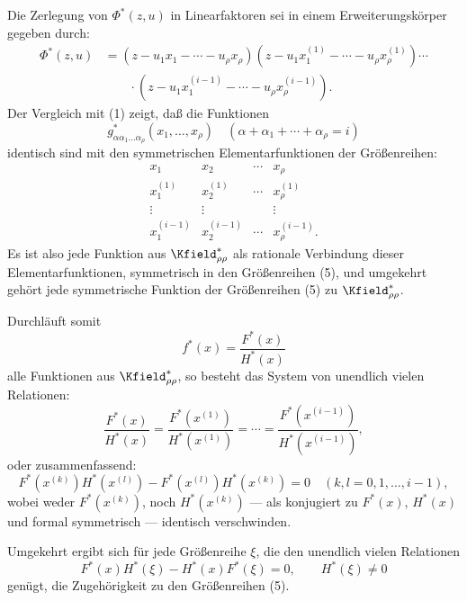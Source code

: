 \documentclass[11pt]{article}
\begin{document}
Die Zerlegung von $\Phi^*(z,u)$ in Linearfaktoren sei in einem Erweiterungskörper gegeben durch:
\begin{equation}
\begin{aligned}
 \Phi^*(z,u)&=(z-u_1x_1-\cdots-u_\rho x_\rho)
 (z-u_1x_1^{(1)}-\cdots-u_\rho x_\rho^{(1)})\cdots\\
 &\qquad\cdot
 (z-u_1x_1^{(i-1)}-\cdots-u_\rho x_\rho^{(i-1)}).
\end{aligned}
\tag{4}
\end{equation}
Der Vergleich mit (1) zeigt, daß die Funktionen
\[
  g^*_{\alpha\alpha_1\ldots\alpha_\rho}(x_1,
  \ldots,x_\rho)\quad(\alpha+\alpha_1+\cdots+\alpha_\rho=i)
\]
identisch sind mit den symmetrischen Elementarfunktionen der Größenreihen:
\begin{equation}
\begin{array}{cccc}
  x_1 & x_2 & \cdots & x_\rho\\
  x_1^{(1)} & x_2^{(1)} & \cdots & x_\rho^{(1)}\\
  \vdots & \vdots & & \vdots\\
  x_1^{(i-1)} & x_2^{(i-1)} & \cdots & x_\rho^{(i-1)}.
\end{array}
\tag{5}
\end{equation}
Es ist also jede Funktion aus $\Kfield^*_{\rho\rho}$ als rationale Verbindung dieser Elementarfunktionen, symmetrisch in den Größenreihen (5), und umgekehrt gehört jede symmetrische Funktion der Größenreihen (5) zu $\Kfield^*_{\rho\rho}$.

Durchläuft somit
\[
  f^*(x)=\frac{F^*(x)}{H^*(x)}
\]
alle Funktionen aus $\Kfield^*_{\rho\rho}$, so besteht das System von unendlich vielen Relationen:
\begin{equation}
  \frac{F^*(x)}{H^*(x)}=
  \frac{F^*(x^{(1)})}{H^*(x^{(1)})}=\cdots=
  \frac{F^*(x^{(i-1)})}{H^*(x^{(i-1)})},
\tag{6}
\end{equation}
oder zusammenfassend:
\[
  F^*(x^{(k)})H^*(x^{(l)})-
  F^*(x^{(l)})H^*(x^{(k)})=0
  \quad(k,l=0,1,\ldots,i-1),
\]
wobei weder $F^*(x^{(k)})$, noch $H^*(x^{(k)})$ --- als konjugiert zu $F^*(x)$, $H^*(x)$ und formal symmetrisch --- identisch verschwinden.

Umgekehrt ergibt sich für jede Größenreihe $\xi$, die den unendlich vielen Relationen
\begin{equation}
  F^*(x)H^*(\xi)-H^*(x)F^*(\xi)=0,
  \qquad H^*(\xi)\ne0
\tag{7}
\end{equation}
genügt, die Zugehörigkeit zu den Größenreihen (5).
\end{document}
